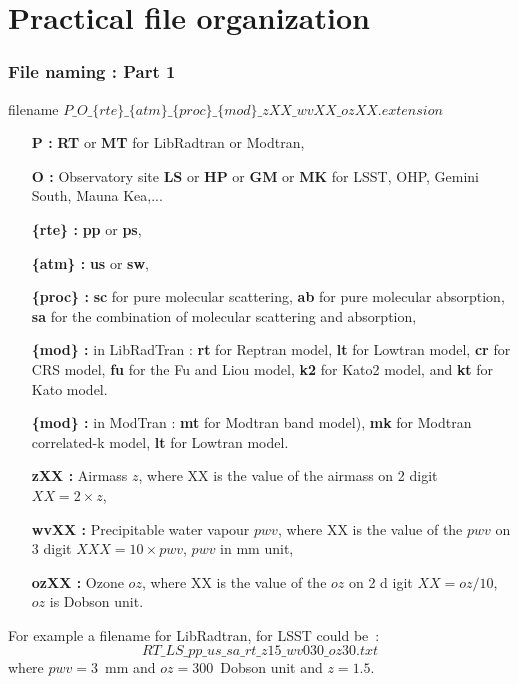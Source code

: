 \documentclass{beamer}
\begin{document}

\section{Practical file organization}

\begin{frame}
\frametitle{File naming : Part 1 }
\begin{block}{filename}
$P\_O\_\{rte\}\_\{atm\}\_\{proc\}\_\{mod\}\_zXX\_wvXX\_ozXX.extension $ 
\end{block}
{\tiny
\begin{itemize}
\item [{\bf P :} ] {\bf RT} or {\bf MT} for LibRadtran or Modtran,
\item [{\bf O :} ]  Observatory site {\bf LS} or {\bf HP}  or {\bf GM}  or {\bf MK} for LSST, OHP, Gemini South, Mauna Kea,...
\item [{\bf \{rte\} :}] {\bf pp} or  {\bf ps},
\item [{\bf \{atm\} :}]  {\bf us} or {\bf sw},
\item [{\bf \{proc\} :}] {\bf sc} for pure molecular scattering, {\bf ab} for pure molecular absorption, {\bf sa} for the combination of molecular scattering and absorption,
\item [{\bf \{mod\} :}] in LibRadTran :  {\bf rt} for Reptran model, {\bf lt} for Lowtran model, {\bf cr} for CRS model,  {\bf fu} for the Fu and Liou model, {\bf k2} for Kato2 model, and {\bf kt} for Kato model.
\item [{\bf \{mod\} :}] in ModTran :  {\bf mt} for Modtran band model), {\bf mk} for Modtran correlated-k model, {\bf lt} for Lowtran model.
\item [{\bf zXX :} ] Airmass $z$, where XX is the value of the airmass on 2 digit $XX=2\times z$,
\item [{\bf wvXX :} ] Precipitable water vapour $pwv$, where XX is the value of the $pwv$ on 3 digit $XXX=10\times pwv$, $pwv$ in mm unit,
\item [{\bf ozXX :} ] Ozone $oz$, where XX is the value of the $oz$ on 2 d igit $XX=oz/10$, $oz$ is Dobson unit.
\end{itemize}

For example a filename for LibRadtran, for LSST could be~:
\begin{equation}
RT\_LS\_pp\_us\_sa\_rt\_z15\_wv030\_oz30.txt  \nonumber
\end{equation}
where $pwv=3$~mm and $oz=300$~Dobson unit and $z=1.5$.

}
\end{frame}
\end{document}
